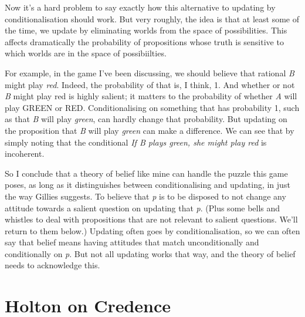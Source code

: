 \documentclass[
  10pt,
  letterpaper,
  DIV=11,
  numbers=noendperiod,
  twoside]{scrartcl}
\begin{document}
Now it's a hard problem to say exactly how this alternative to updating
by conditionalisation should work. But very roughly, the idea is that at
least some of the time, we update by eliminating worlds from the space
of possibilities. This affects dramatically the probability of
propositions whose truth is sensitive to which worlds are in the space
of possibiilties.

For example, in the game I've been discussing, we should believe that
rational \emph{B} might play \emph{red}. Indeed, the probability of that
is, I think, 1. And whether or not \emph{B} might play red is highly
salient; it matters to the probability of whether \emph{A} will play
GREEN or RED. Conditionalising on something that has probability 1, such
as that \emph{B} will play \emph{green}, can hardly change that
probability. But updating on the proposition that \emph{B} will play
\emph{green} can make a difference. We can see that by simply noting
that the conditional \emph{If B plays green, she might play red} is
incoherent.

So I conclude that a theory of belief like mine can handle the puzzle
this game poses, as long as it distinguishes between conditionalising
and updating, in just the way Gillies suggests. To believe that \emph{p}
is to be disposed to not change any attitude towards a salient question
on updating that \emph{p}. (Plus some bells and whistles to deal with
propositions that are not relevant to salient questions. We'll return to
them below.) Updating often goes by conditionalisation, so we can often
say that belief means having attitudes that match unconditionally and
conditionally on \emph{p}. But not all updating works that way, and the
theory of belief needs to acknowledge this.

\section{Holton on Credence}\label{holton-on-credence}
\end{document}

